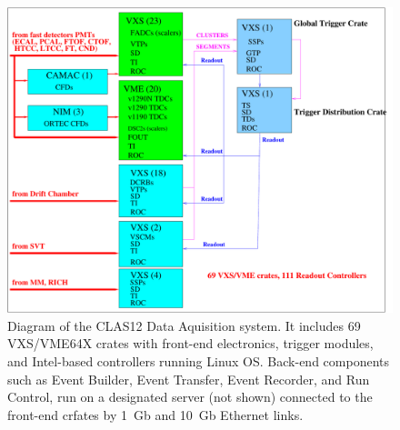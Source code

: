 \begin{figure}[hbt]
	\centering
	\includegraphics[width=1.0\columnwidth,keepaspectratio]{img/CLAS12_HARDWARE_2.pdf}
	\caption{Diagram of the CLAS12 Data Aquisition system. It includes 69 VXS/VME64X crates with front-end electronics, trigger modules, and Intel-based controllers running Linux OS. Back-end components such as Event Builder, Event Transfer, Event Recorder, and Run Control, run on a designated server (not shown) connected to the front-end crfates by 1~Gb and 10~Gb Ethernet links.}
	\label{fig:DAQdiagram}
\end{figure}

